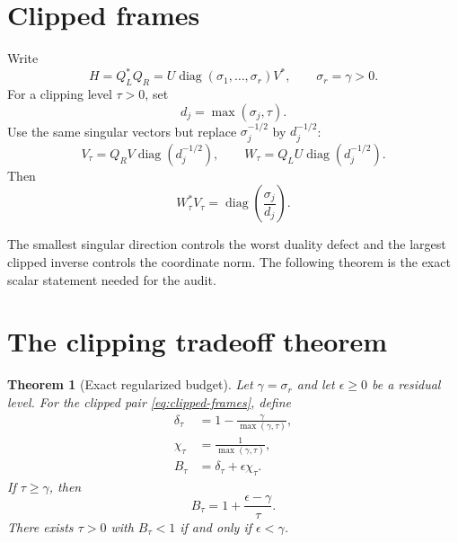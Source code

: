 \documentclass[12pt]{article}
\newtheorem{theorem}{Theorem}[section]
\theoremstyle{remark}
\begin{document}
\section{Clipped frames}

Write
\begin{equation}\label{eq:cross-svd}
 H=Q_L^*Q_R=U\operatorname{diag}(\sigma_1,\ldots,\sigma_r)V^*,
 \qquad \sigma_r=\gamma>0.
\end{equation}
For a clipping level $\tau>0$, set
\begin{equation}\label{eq:effective}
 d_j=\max(\sigma_j,\tau).
\end{equation}
Use the same singular vectors but replace $\sigma_j^{-1/2}$ by
$d_j^{-1/2}$:
\begin{equation}\label{eq:clipped-frames}
 V_\tau=Q_RV\operatorname{diag}(d_j^{-1/2}),
 \qquad
 W_\tau=Q_LU\operatorname{diag}(d_j^{-1/2}).
\end{equation}
Then
\begin{equation}\label{eq:approx-dual}
 W_\tau^*V_\tau
 =\operatorname{diag}\left(\frac{\sigma_j}{d_j}\right).
\end{equation}

The smallest singular direction controls the worst duality defect and the
largest clipped inverse controls the coordinate norm.  The following theorem
is the exact scalar statement needed for the audit.

\section{The clipping tradeoff theorem}

\begin{theorem}[Exact regularized budget]\label{thm:tradeoff}
Let $\gamma=\sigma_r$ and let $\epsilon\ge0$ be a residual level.  For the
clipped pair \eqref{eq:clipped-frames}, define
\begin{align}
 \delta_\tau&=1-\frac{\gamma}{\max(\gamma,\tau)},
 \label{eq:duality-defect}\\
 \chi_\tau&=\frac1{\max(\gamma,\tau)},
 \label{eq:regularized-condition}\\
 B_\tau&=\delta_\tau+\epsilon\chi_\tau.
 \label{eq:combined}
\end{align}
If $\tau\ge\gamma$, then
\begin{equation}\label{eq:identity}
 B_\tau=1+\frac{\epsilon-\gamma}{\tau}.
\end{equation}
There exists $\tau>0$ with $B_\tau<1$ if and only if $\epsilon<\gamma$.
\end{theorem}
\end{document}
